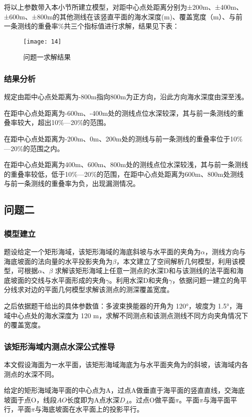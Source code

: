 \documentclass[withoutpreface,bwprint]{cumcmthesis} %
\begin{document}
将以上参数带入本小节所建立模型，对距中心点处距离分别为±200m、±400m、±600m、±800m的其他测线在该竖直平面的海水深度(m)、覆盖宽度（m）、与前一条测线的重叠率\%共三个指标值进行求解，结果见下表：
\begin{figure}[H]
    \centering
    \texttt{[image: 14]}
    \caption{问题一求解结果}
    \label{fig:four}
\end{figure}
\subsubsection{结果分析}
规定由距中心点处距离为-800m指向800m为正方向，沿此方向海水深度由深至浅。

在距中心点处距离为-600m、-400m处的测线点位水深较深，其与前一条测线的重叠率较大，超出10\%—20\%的范围。

在距中心点处距离为-200m、0m、200m处的测线与前一条测线的重叠率位于10\%—20\%的范围之内。

在距中心点处距离为400m、600m、800m处的测线点位水深较浅，其与前一条测线的重叠率较低，低于10\%—20\%的范围，在距中心点处距离为600m、800m处测线与前一条测线的重叠率为负，出现漏测情况。

\subsection{问题二}
\subsubsection{模型建立}
题设给定一个矩形海域，该矩形海域的海底斜坡与水平面的夹角为$\alpha$，测线方向与海底坡面的法向量的水平投影夹角为$\beta$，本文建立了空间解析几何模型，利用该模型，可根据$\alpha$、$\beta$ 求解该矩形海域上任意一测点的水深D和与该测线的法平面和海底坡面的交线与水平面形成的夹角$\gamma$。利用水深D和夹角$\gamma$，依据问题一建立的角平分线求对边的平面几何模型求解该测点的测深覆盖宽度。

之后依据题干给出的具体参数值：多波束换能器的开角为 120°，坡度为 1.5°，海域中心点处的海水深度为 120 m，求解不同测点和该测点测线不同方向夹角情况下的覆盖宽度。
\subsubsection{该矩形海域内测点水深公式推导}
本文假设海面为一水平面，该矩形海域海底为与水平面夹角为的斜坡，该海域内各测点的水深不同。

给定的矩形海域海平面的中心点为A，过点A做垂直于海平面的竖直直线，交海底坡面于点O，线段$AO$长度即为A点水深$D_A$。过点O做平面$\pi$。平面$\pi$与海平面平行，平面$\pi$与海底坡面在水平面上的投影平行。
\end{document}
